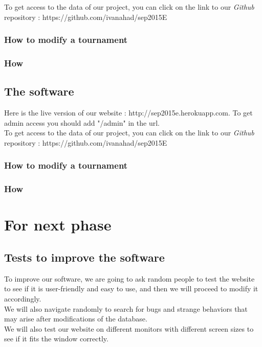 \documentclass[a4paper, 12pt]{article}
\begin{document}
To get access to the data of our project, you can click on the link to our \textit{Github} repository : https://github.com/ivanahad/sep2015E\\
\subsubsection*{How to modify a tournament}

\subsubsection*{How }
\subsection{The software}


Here is the live version of our website : http://sep2015e.herokuapp.com.  To get admin access you should add "/admin" in the url.\\

To get access to the data of our project, you can click on the link to our \textit{Github} repository : https://github.com/ivanahad/sep2015E\\
\subsubsection*{How to modify a tournament}

\subsubsection*{How }

\section{For next phase}
\subsection{Tests to improve the software}
To improve our software, we are going to ask random people to test the website to see if it is user-friendly and easy to use, and then we will proceed to modify it accordingly.\\

We will also navigate randomly to search for bugs and strange behaviors that may arise after modifications of the database.\\
 
We will also test our website on different monitors with different screen sizes to see if it fits the window correctly.\\
\end{document}
